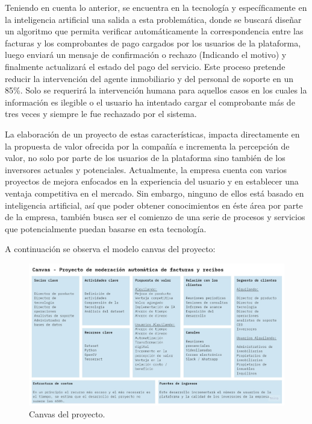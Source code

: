 \documentclass[
11pt, %
]{charter}
\begin{document}
\begin{•}
Teniendo en cuenta lo anterior, se encuentra en la tecnología y específicamente en la inteligencia artificial una salida a esta problemática, donde se buscará diseñar un algoritmo que permita verificar automáticamente la correspondencia entre las facturas y los comprobantes de pago cargados por los usuarios de la plataforma, luego enviará un mensaje de confirmación o rechazo (Indicando el motivo) y finalmente actualizará el estado del pago del servicio. Este proceso pretende reducir la intervención del agente inmobiliario y del personal de soporte en un 85\%. Solo se requerirá la intervención humana para aquellos casos en los cuales la información es ilegible o el usuario ha intentado cargar el comprobante más de tres veces y siempre le fue rechazado por el sistema.

La elaboración de un proyecto de estas características, impacta directamente en la propuesta de valor ofrecida por la compañía e incrementa la percepción de valor, no solo por parte de los usuarios de la plataforma sino también de los inversores actuales y potenciales. Actualmente, la empresa cuenta con varios proyectos de mejora enfocados en la experiencia del usuario y en establecer una ventaja competitiva en el mercado. Sin embargo, ninguno de ellos está basado en inteligencia artificial, así que poder obtener conocimientos en éste área por parte de la empresa, también busca ser el comienzo de una serie de procesos y servicios que potencialmente puedan basarse en esta tecnología.

A continuación se observa el modelo canvas del proyecto:


\begin{figure}[htpb]
\centering 
\includegraphics[width=1\textwidth]{./Figuras/Canvas_1.jpg}
\caption{Canvas del proyecto.}
\label{fig:Canvas_1}
\end{figure}


\end{•}
\end{document}
